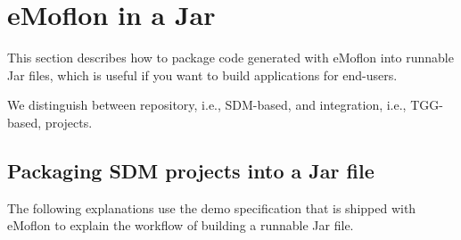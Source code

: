 \newpage
\section{eMoflon in a Jar}
\genHeader

This section describes how to package code generated with eMoflon into
runnable Jar files, which is useful if you want to build applications for end-users.

We distinguish between repository, i.e., SDM-based, and integration,
i.e., TGG-based, projects.

\subsection{Packaging SDM projects into a Jar file}

The following explanations use the demo specification that is shipped with
eMoflon to explain the workflow of building a runnable Jar file.

